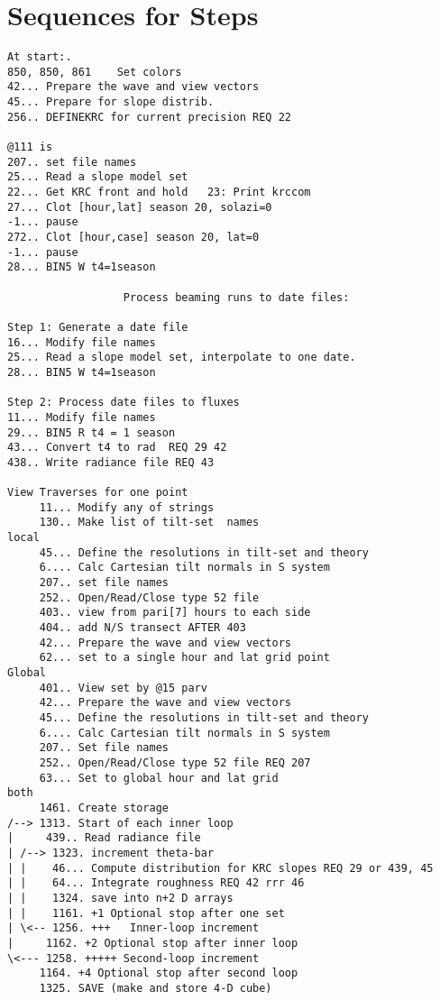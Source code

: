\documentclass{article}
\begin{document}
\section{Sequences for Steps}
\vspace{-3.mm} 
\begin{verbatim}
At start:.
850, 850, 861    Set colors
42... Prepare the wave and view vectors
45... Prepare for slope distrib.
256.. DEFINEKRC for current precision REQ 22 

@111 is
207.. set file names
25... Read a slope model set
22... Get KRC front and hold   23: Print krccom
27... Clot [hour,lat] season 20, solazi=0
-1... pause
272.. Clot [hour,case] season 20, lat=0
-1... pause
28... BIN5 W t4=1season

                  Process beaming runs to date files:

Step 1: Generate a date file
16... Modify file names
25... Read a slope model set, interpolate to one date.
28... BIN5 W t4=1season

Step 2: Process date files to fluxes
11... Modify file names
29... BIN5 R t4 = 1 season
43... Convert t4 to rad  REQ 29 42
438.. Write radiance file REQ 43

View Traverses for one point
     11... Modify any of strings
     130.. Make list of tilt-set  names
local
     45... Define the resolutions in tilt-set and theory
     6.... Calc Cartesian tilt normals in S system
     207.. set file names
     252.. Open/Read/Close type 52 file
     403.. view from pari[7] hours to each side
     404.. add N/S transect AFTER 403
     42... Prepare the wave and view vectors
     62... set to a single hour and lat grid point
Global
     401.. View set by @15 parv
     42... Prepare the wave and view vectors
     45... Define the resolutions in tilt-set and theory 
     6.... Calc Cartesian tilt normals in S system
     207.. Set file names
     252.. Open/Read/Close type 52 file REQ 207
     63... Set to global hour and lat grid
both
     1461. Create storage
/--> 1313. Start of each inner loop
|     439.. Read radiance file
| /--> 1323. increment theta-bar
| |    46... Compute distribution for KRC slopes REQ 29 or 439, 45
| |    64... Integrate roughness REQ 42 rrr 46 
| |    1324. save into n+2 D arrays
| |    1161. +1 Optional stop after one set
| \<-- 1256. +++   Inner-loop increment
|     1162. +2 Optional stop after inner loop
\<--- 1258. +++++ Second-loop increment
     1164. +4 Optional stop after second loop
     1325. SAVE (make and store 4-D cube)


\end{verbatim}
\end{document}
